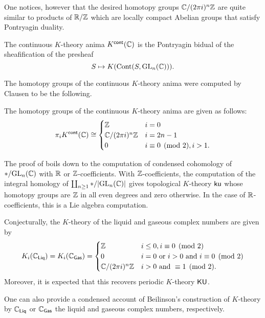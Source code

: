 One notices, however that the desired homotopy groups $\mathbb{C}/(2\pi i)^{n}\mathbb{Z}$ are quite similar to products of $\mathbb{R}/\mathbb{Z}$ which are locally compact Abelian groups that satisfy Pontryagin duality. 
\begin{definition}\label{def: continuous K-theory anima}
    The continuous $K$-theory anima $K^{\mathsf{cont}}(\mathbb{C})$ is the Pontryagin bidual of the sheafification of the presheaf 
    $$S\mapsto K(\mathrm{Cont}(S,\mathrm{GL}_{n}(\mathbb{C}))).$$
\end{definition}
The homotopy groups of the continuous $K$-theory anima were computed by Clausen to be the following. 
\begin{theorem}[Clausen]\label{thm: Clausen condensed k theory}
    The homotopy groups of the continuous $K$-theory anima are given as follows:
    $$\pi_{i}K^{\mathsf{cont}}(\mathbb{C})\cong\begin{cases}
        \mathbb{Z} & i=0 \\
        \mathbb{C}/(2\pi i)^{n}\mathbb{Z} & i=2n-1 \\
        0 & i\equiv0\pmod{2}, i>1.
    \end{cases}$$
\end{theorem}
The proof of  boils down to the computation of condensed cohomology of $*/\mathrm{GL}_{n}(\mathbb{C})$ with $\mathbb{R}$ or $\mathbb{Z}$-coefficients. With $\mathbb{Z}$-coefficients, the computation of the integral homology of $\coprod_{n\geq 1}*/|\mathrm{GL}_{n}(\mathbb{C})|$ gives topological $K$-theory $\mathsf{ku}$ whose homotopy groups are $\mathbb{Z}$ in all even degrees and zero otherwise. In the case of $\mathbb{R}$-coefficients, this is a Lie algebra computation.
\begin{remark}
    Conjecturally, the $K$-theory of the liquid and gaseous complex numbers are given by 
    $$K_{i}(\mathbb{C}_{\mathsf{Liq}})=K_{i}(\mathbb{C}_{\mathsf{Gas}})=\begin{cases}
        \mathbb{Z} & i\leq 0, i\equiv0\pmod{2} \\
        0 & i=0 \text{ or }i>0\text{ and }i\equiv0\pmod{2} \\
        \mathbb{C}/(2\pi i)^{n}\mathbb{Z} & i>0\text{ and }\equiv1\pmod{2}.
    \end{cases}$$
    Moreover, it is expected that this recovers periodic $K$-theory $\mathsf{KU}$. 
\end{remark}

One can also provide a condensed account of Beilinson's construction of $K$-theory by $\mathbb{C}_{\mathsf{Liq}}$ or $\mathbb{C}_{\mathsf{Gas}}$ the liquid and gaseous complex numbers, respectively. 

